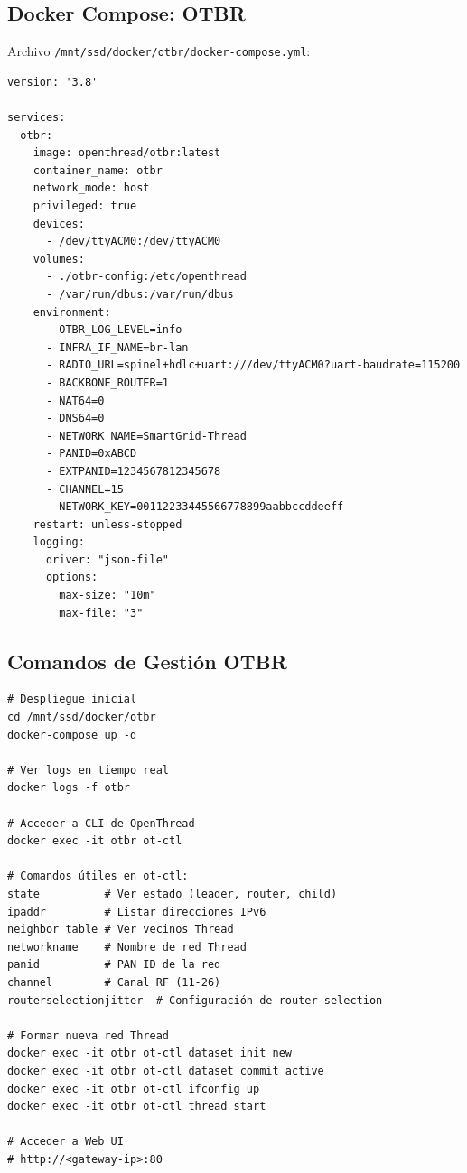 \subsection{Docker Compose: OTBR}

Archivo \texttt{/mnt/ssd/docker/otbr/docker-compose.yml}:

\begin{verbatim}
version: '3.8'

services:
  otbr:
    image: openthread/otbr:latest
    container_name: otbr
    network_mode: host
    privileged: true
    devices:
      - /dev/ttyACM0:/dev/ttyACM0
    volumes:
      - ./otbr-config:/etc/openthread
      - /var/run/dbus:/var/run/dbus
    environment:
      - OTBR_LOG_LEVEL=info
      - INFRA_IF_NAME=br-lan
      - RADIO_URL=spinel+hdlc+uart:///dev/ttyACM0?uart-baudrate=115200
      - BACKBONE_ROUTER=1
      - NAT64=0
      - DNS64=0
      - NETWORK_NAME=SmartGrid-Thread
      - PANID=0xABCD
      - EXTPANID=1234567812345678
      - CHANNEL=15
      - NETWORK_KEY=00112233445566778899aabbccddeeff
    restart: unless-stopped
    logging:
      driver: "json-file"
      options:
        max-size: "10m"
        max-file: "3"
\end{verbatim}

\subsection{Comandos de Gestión OTBR}

\begin{verbatim}
# Despliegue inicial
cd /mnt/ssd/docker/otbr
docker-compose up -d

# Ver logs en tiempo real
docker logs -f otbr

# Acceder a CLI de OpenThread
docker exec -it otbr ot-ctl

# Comandos útiles en ot-ctl:
state          # Ver estado (leader, router, child)
ipaddr         # Listar direcciones IPv6
neighbor table # Ver vecinos Thread
networkname    # Nombre de red Thread
panid          # PAN ID de la red
channel        # Canal RF (11-26)
routerselectionjitter  # Configuración de router selection

# Formar nueva red Thread
docker exec -it otbr ot-ctl dataset init new
docker exec -it otbr ot-ctl dataset commit active
docker exec -it otbr ot-ctl ifconfig up
docker exec -it otbr ot-ctl thread start

# Acceder a Web UI
# http://<gateway-ip>:80
\end{verbatim}

